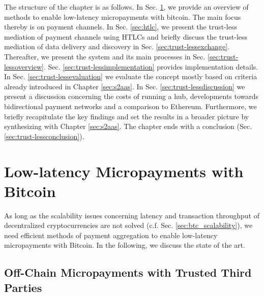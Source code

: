 The structure of the chapter is as follows. In Sec. \ref{sec:micropayments}, we provide an overview of methods to enable low-latency micropayments with bitcoin. The main focus thereby is on payment channels. In Sec. \ref{sec:htlc}, we present the trust-less mediation of payment channels using \ac{HTLC}s and briefly discuss the trust-less mediation of data delivery and discovery in Sec. \ref{sec:trust-lessexchange}. Thereafter, we present the system and its main processes in Sec. \ref{sec:trust-lessoverview}. Sec. \ref{sec:trust-lessimplementation} provides implementation details. In Sec. \ref{sec:trust-lessevaluation} we evaluate the concept mostly based on criteria already introduced in Chapter \ref{sec:s2aas}. In Sec. \ref{sec:trust-lessdiscussion} we present a discussion concerning the costs of running a hub, developments towards bidirectional payment networks and a comparison to Ethereum. Furthermore, we briefly recapitulate the key findings and set the results in a broader picture by synthesizing with Chapter \ref{sec:s2aas}. The chapter ends with a conclusion (Sec. \ref{sec:trust-lessconclusion}).


\section{Low-latency Micropayments with Bitcoin}
\label{sec:micropayments}

As long as the scalability issues concerning latency and transaction throughput of decentralized cryptocurrencies are not solved (c.f. Sec. \ref{sec:btc_scalability}), we need efficient methods of payment aggregation to enable low-latency micropayments with Bitcoin. In the following, we discuss the state of the art. 


\subsection{Off-Chain Micropayments with Trusted Third Parties}

